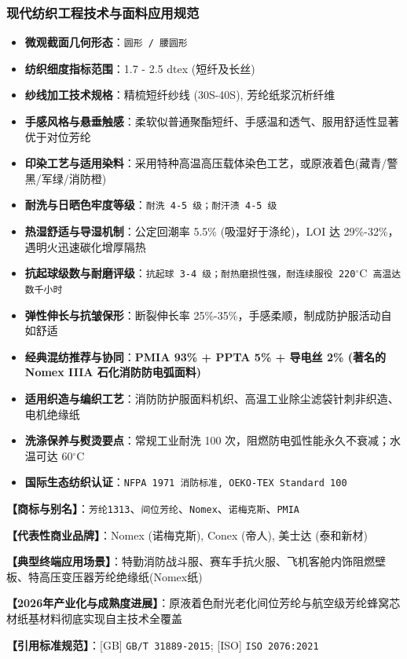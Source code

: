 \documentclass[11pt,openright,twoside,UTF8]{ctexbook}
\begin{document}
\subsubsection*{现代纺织工程技术与面料应用规范}
\begin{itemize} \setlength{\itemsep}{2pt}
    \item \textbf{微观截面几何形态}：\texttt{圆形 / 腰圆形}
    \item \textbf{纺织细度指标范围}：1.7 - 2.5 dtex (短纤及长丝)
    \item \textbf{纱线加工技术规格}：精梳短纤纱线 (30S-40S), 芳纶纸浆沉析纤维
    \item \textbf{手感风格与悬垂触感}：柔软似普通聚酯短纤、手感温和透气、服用舒适性显著优于对位芳纶
    \item \textbf{印染工艺与适用染料}：采用特种高温高压载体染色工艺，或原液着色(藏青/警黑/军绿/消防橙)
    \item \textbf{耐洗与日晒色牢度等级}：\texttt{耐洗 4-5 级；耐汗渍 4-5 级}
    \item \textbf{热湿舒适与导湿机制}：公定回潮率 5.5\% (吸湿好于涤纶)，LOI 达 29\%-32\%，遇明火迅速碳化增厚隔热
    \item \textbf{抗起球级数与耐磨评级}：\texttt{抗起球 3-4 级；耐热磨损性强，耐连续服役 220$^\circ\mathrm{C}$ 高温达数千小时}
    \item \textbf{弹性伸长与抗皱保形}：断裂伸长率 25\%-35\%，手感柔顺，制成防护服活动自如舒适
    \item \textbf{经典混纺推荐与协同}：\textbf{PMIA 93\% + PPTA 5\% + 导电丝 2\% (著名的 Nomex IIIA 石化消防防电弧面料)}
    \item \textbf{适用织造与编织工艺}：消防防护服面料机织、高温工业除尘滤袋针刺非织造、电机绝缘纸
    \item \textbf{洗涤保养与熨烫要点}：常规工业耐洗 100 次，阻燃防电弧性能永久不衰减；水温可达 60$^\circ\mathrm{C}$
    \item \textbf{国际生态纺织认证}：\texttt{NFPA 1971 消防标准, OEKO-TEX Standard 100}
\end{itemize}
\vspace{0.2cm}

\noindent\textbf{【商标与别名】}：\texttt{芳纶1313}、\texttt{间位芳纶}、\texttt{Nomex}、\texttt{诺梅克斯}、\texttt{PMIA}\par
\noindent\textbf{【代表性商业品牌】}：Nomex (诺梅克斯), Conex (帝人), 美士达 (泰和新材)\par
\noindent\textbf{【典型终端应用场景】}：特勤消防战斗服、赛车手抗火服、飞机客舱内饰阻燃壁板、特高压变压器芳纶绝缘纸(Nomex纸)\par
\noindent\textbf{【2026年产业化与成熟度进展】}：原液着色耐光老化间位芳纶与航空级芳纶蜂窝芯材纸基材料彻底实现自主技术全覆盖\par
\noindent\textbf{【引用标准规范】}：[GB] \texttt{GB/T 31889-2015}; [ISO] \texttt{ISO 2076:2021}\par
\vspace{0.5cm}
\end{document}
